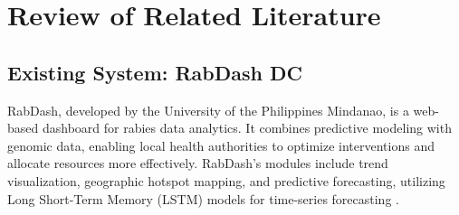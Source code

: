 \chapter{Review of Related Literature}
\label{sec:relatedlit}

\begin{comment}
A literature review is a piece of discursive prose, not a list describing or summarizing one piece of literature after another. It’s usually a bad sign to see every paragraph beginning with the name of a researcher. Instead, organize the literature review into sections that present themes or identify trends, including relevant theory. You are not trying to list all the materials published, but to synthesize and evaluate them according to the guiding concept of your thesis or research question. You should also state the limits or gaps of their researches wherein you will try to fill these gaps in accordance to your research problem and objectives.	content...
\end{comment}



\begin{comment}

%
%
Guide on Writing your RRL chapter

1. Identify the keywords with respect to your research
One keyword = One document section
Examples: 2.1 Story Generation Systems
2.2 Knowledge Representation

2.  Find references using these keywords

3.  For each of the references that you find,
Check: Is it relevant to your research?
Use their references to find more relevant works.

4. Identify a set of criteria for comparison.
It will serve as a guide to help you focus on what to look for

5. Write a summary focusing on -
What: A short description of the work
How: A summary of the approach it utilized
Findings: If applicable, provide the results
Why: Relevance to your work

6. At the end of each section,  show a Table of Comparison of the related works
and your proposed project/system

\end{comment}

\section{Existing System: RabDash DC}
%
%
RabDash, developed by the University of the Philippines Mindanao, is a web-based dashboard for rabies data analytics. It combines predictive modeling with genomic data, enabling local health authorities to optimize interventions and allocate resources more effectively. RabDash's modules include trend visualization, geographic hotspot mapping, and predictive forecasting, utilizing Long Short-Term Memory (LSTM) models for time-series forecasting \cite{rabdash}.

